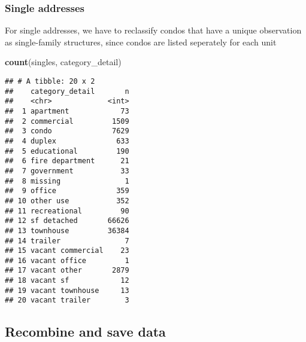\documentclass[]{article}
\newenvironment{Shaded}{\begin{snugshade}}{\end{snugshade}}
\newcommand{\KeywordTok}[1]{\textcolor[rgb]{0.13,0.29,0.53}{\textbf{#1}}}
\newcommand{\DataTypeTok}[1]{\textcolor[rgb]{0.13,0.29,0.53}{#1}}
\newcommand{\StringTok}[1]{\textcolor[rgb]{0.31,0.60,0.02}{#1}}
\newcommand{\OperatorTok}[1]{\textcolor[rgb]{0.81,0.36,0.00}{\textbf{#1}}}
\newcommand{\NormalTok}[1]{#1}
\begin{document}
\subsubsection{Single addresses}\label{single-addresses}

For single addresses, we have to reclassify condos that have a unique
observation as single-family structures, since condos are listed
seperately for each unit

\begin{Shaded}
\begin{Highlighting}[]
\KeywordTok{count}\NormalTok{(singles, category_detail)}
\end{Highlighting}
\end{Shaded}

\begin{verbatim}
## # A tibble: 20 x 2
##    category_detail       n
##    <chr>             <int>
##  1 apartment            73
##  2 commercial         1509
##  3 condo              7629
##  4 duplex              633
##  5 educational         190
##  6 fire department      21
##  7 government           33
##  8 missing               1
##  9 office              359
## 10 other use           352
## 11 recreational         90
## 12 sf detached       66626
## 13 townhouse         36384
## 14 trailer               7
## 15 vacant commercial    23
## 16 vacant office         1
## 17 vacant other       2879
## 18 vacant sf            12
## 19 vacant townhouse     13
## 20 vacant trailer        3
\end{verbatim}

\begin{Shaded}
\end{Shaded}

\subsection{Recombine and save data}\label{recombine-and-save-data}
\end{document}

